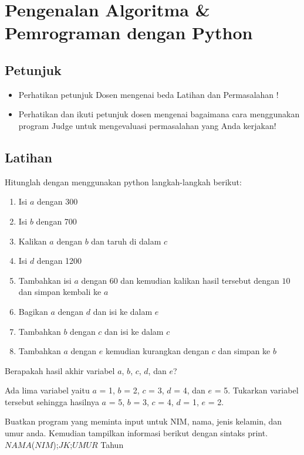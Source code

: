\chapter{Pengenalan Algoritma \& Pemrograman dengan Python}

\section{Petunjuk}
\begin{itemize}
	\item Perhatikan petunjuk Dosen mengenai beda Latihan dan Permasalahan !
	\
	\item Perhatikan dan ikuti petunjuk dosen mengenai bagaimana cara menggunakan program Judge untuk mengevaluasi permasalahan yang Anda kerjakan!
\end{itemize}

\section{Latihan}
\begin{latihan}
Hitunglah dengan menggunakan python langkah-langkah berikut:
\begin{enumerate}
	\item Isi $a$ dengan 300
	\item Isi $b$ dengan 700
	\item Kalikan $a$ dengan $b$ dan taruh di dalam $c$
	\item Isi $d$ dengan 1200
	\item Tambahkan isi $a$ dengan 60 dan kemudian kalikan hasil tersebut dengan $10$ dan simpan kembali ke $a$   
	\item Bagikan $a$ dengan $d$ dan isi ke dalam $e$
	\item Tambahkan $b$ dengan $c$ dan isi ke dalam $c$
	\item Tambahkan $a$ dengan $e$ kemudian kurangkan dengan $c$ dan simpan ke $b$
\end{enumerate}
Berapakah hasil akhir variabel $a$, $b$, $c$, $d$, dan $e$? 
\end{latihan}

\begin{latihan}
Ada lima variabel yaitu $a$ = 1, $b$ = 2, $c$ = 3, $d$ = 4, dan $e$ = 5. Tukarkan variabel tersebut sehingga hasilnya $a$ = 5, $b$ = 3, $c$ = 4, $d$ = 1, $e$ = 2. 
\end{latihan}


\begin{latihan}
Buatkan program yang meminta input untuk NIM, nama, jenis kelamin, dan umur anda. Kemudian tampilkan informasi berikut dengan sintaks print.\\

\centering
$NAMA$($NIM$);$JK$;$UMUR$ Tahun

\end{latihan}

